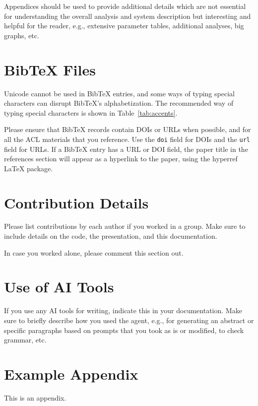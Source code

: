 \documentclass[11pt]{article}
\begin{document}
Appendices should be used to provide additional details which are not essential for understanding the overall analysis and system description but interesting and helpful for the reader, e.g., extensive parameter tables, additional analyses, big graphs, etc. 

\section{Bib\TeX{} Files}
\label{sec:bibtex}

Unicode cannot be used in Bib\TeX{} entries, and some ways of typing special characters can disrupt Bib\TeX's alphabetization. The recommended way of typing special characters is shown in Table~\ref{tab:accents}.

Please ensure that Bib\TeX{} records contain DOIs or URLs when possible, and for all the ACL materials that you reference.
Use the \verb|doi| field for DOIs and the \verb|url| field for URLs.
If a Bib\TeX{} entry has a URL or DOI field, the paper title in the references section will appear as a hyperlink to the paper, using the hyperref \LaTeX{} package.

\section*{Contribution Details}
Please list contributions by each author if you worked in a group. Make sure to include details on the code, the presentation, and this documentation. 

In case you worked alone, please comment this section out.

\section*{Use of AI Tools}
If you use any AI tools for writing, indicate this in your documentation. Make sure to briefly describe how you used the agent, e.g., for generating an abstract or specific paragraphs based on prompts that you took as is or modified, to check grammar, etc.




\appendix

\section{Example Appendix}
\label{sec:appendix}

This is an appendix.
\end{document}
